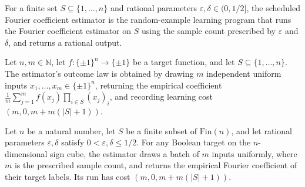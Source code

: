 \begin{definition}
\label{FABL.scheduledFourierCoeffEstimatorProgram}
\leanok
{}
For a finite set $S\subseteq\{1,\ldots,n\}$ and rational parameters
$\varepsilon,\delta\in(0,1/2]$, the scheduled Fourier coefficient estimator is the
random-example learning program that runs the Fourier coefficient estimator on $S$ using
the sample count prescribed by $\varepsilon$ and $\delta$, and returns a rational
output.
\end{definition}

\begin{theorem}
\label{FABL.runWithCost_fourierCoeffEstimatorProgram}
\leanok
{}
Let $n,m\in\mathbb N$, let $f:\{\pm1\}^n\to\{\pm1\}$ be a target function, and let
$S\subseteq\{1,\ldots,n\}$. The estimator's outcome law is obtained by drawing $m$
independent uniform inputs $x_1,\ldots,x_m\in\{\pm1\}^n$, returning the empirical
coefficient $\frac1m\sum_{j=1}^m f(x_j)\prod_{i\in S}(x_j)_i$, and recording learning
cost $(m,0,m+m(|S|+1))$.
\end{theorem}

\begin{theorem}
\label{FABL.runWithCost_scheduledFourierCoeffEstimatorProgram}
\leanok
{}
Let $n$ be a natural number, let $S$ be a finite subset of $\mathrm{Fin}(n)$, and let rational parameters $\varepsilon,\delta$ satisfy $0<\varepsilon,\delta\le 1/2$. For any Boolean target on the $n$-dimensional sign cube, the estimator draws a batch of $m$ inputs uniformly, where $m$ is the prescribed sample count, and returns the empirical Fourier coefficient of their target labels. Its run has cost $(m,0,m+m(|S|+1))$.
\end{theorem}

